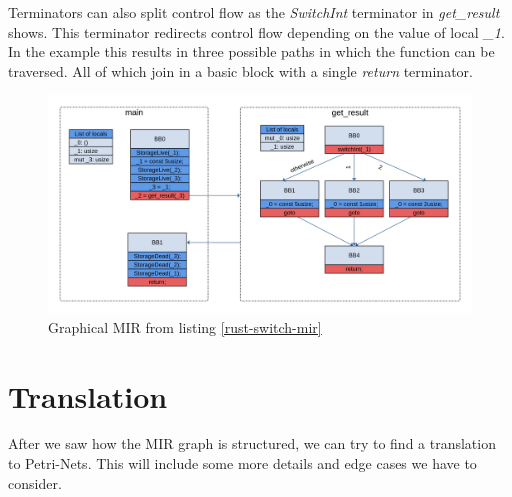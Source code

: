 Terminators can also split control flow as the \textit{SwitchInt} terminator in \textit{get\_result} shows.
This terminator redirects control flow depending on the value of local \textit{\_1}.
In the example this results in three possible paths in which the function can be traversed.
All of which join in a basic block with a single \textit{return} terminator.

\begin{figure}
    \centering
    \includegraphics[width=\textwidth]{../diagrams/SwitchInt.png}
    \caption{
        Graphical MIR from listing \ref{rust-switch-mir}
        }
    \label{switch-mir-graph}
\end{figure}

\section{Translation}
\label{app_trans}
After we saw how the MIR graph is structured, we can try to find a translation to Petri-Nets. This will include some more details and edge cases we have to consider.

